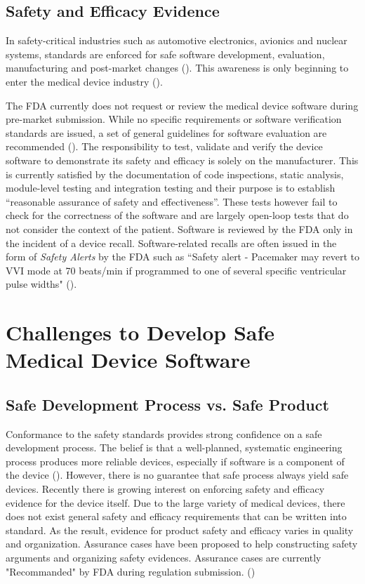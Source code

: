 \subsection{Safety and Efficacy Evidence}
In safety-critical industries such as automotive electronics, avionics and nuclear systems, standards are enforced for safe software development, evaluation, manufacturing and post-market changes (\cite{autosar,avsi}). This awareness is only beginning to enter the medical device industry (\cite{formal_fda}). 

The FDA currently does not request or review the medical device software during pre-market submission. While no specific requirements or software verification standards are issued, a set of general guidelines for software evaluation are recommended (\cite{fda1, fda2, fda3}). The responsibility to test, validate and verify the device software to demonstrate its safety and efficacy is solely on the manufacturer. This is currently satisfied by the documentation of code inspections, static analysis, module-level testing and integration testing and their purpose is to establish ``reasonable assurance of safety and effectiveness''. These tests however fail to check for the correctness of the software and are largely open-loop tests that do not consider the context of the patient. Software is reviewed by the FDA only in the incident of a device recall. Software-related recalls are often issued in the form of \emph{Safety Alerts} by the %
FDA such as ``Safety alert - Pacemaker may revert to VVI mode at 70 beats/min if programmed to one of several specific ventricular pulse widths" (\cite{medstats}).


\section{Challenges to Develop Safe Medical Device Software}
\subsection{Safe Development Process vs. Safe Product}
Conformance to the safety standards provides strong confidence on a safe development process. The belief is that a well-planned, systematic engineering process produces more reliable devices, especially if software is a component of the device (\cite{med-book}). However, there is no guarantee that safe process always yield safe devices. Recently there is growing interest on enforcing safety and efficacy evidence for the device itself. \cite{Wassyng} Due to the large variety of medical devices, there does not exist general safety and efficacy requirements that can be written into standard. As the result, evidence for product safety and efficacy varies in quality and organization. Assurance cases \cite{} have been proposed to help constructing safety arguments and organizing safety evidences. Assurance cases are currently "Recommanded" by FDA during regulation submission. (\cite{})

